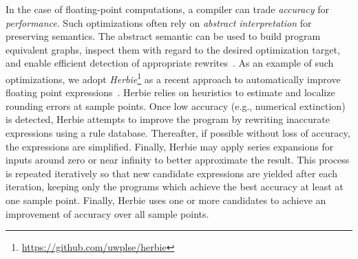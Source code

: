 In the case of floating-point computations, a compiler can trade \emph{accuracy}
for \emph{performance}. Such optimizations often rely on
\emph{abstract interpretation} for preserving semantics. The abstract semantic can be
used to build program equivalent graphs, inspect them with regard to the desired
optimization target, and enable efficient detection of appropriate
rewrites~\cite{Ioualalen2012}. 
As an example of such optimizations, we adopt
\emph{Herbie}\footnote{\url{https://github.com/uwplse/herbie}} as a recent approach to 
automatically improve floating point expressions~\cite{Panchekha2015}. 
%
Herbie relies on heuristics to estimate and localize rounding errors at sample points. 
%
%
Once low accuracy (e.g., numerical extinction) is detected, Herbie attempts to improve the program 
by rewriting inaccurate expressions using a rule database. 
%
%
Thereafter, if possible without loss of accuracy, the expressions are simplified. 
%
Finally, Herbie may apply series expansions for inputs around zero or near infinity to better 
approximate the result.
%
%
This process is repeated iteratively so that new candidate expressions are yielded after
each iteration, keeping only the programs which achieve the best accuracy at least
at one sample point. Finally, Herbie uses one or more candidates to achieve an improvement
of accuracy over all sample points.

